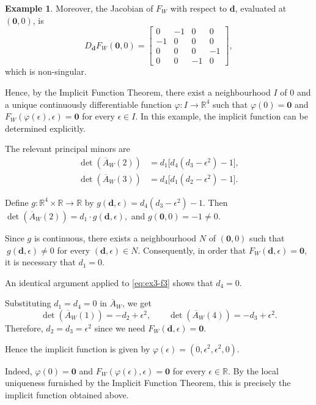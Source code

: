 \documentclass[12pt,reqno]{amsart}
\theoremstyle{plain}
\theoremstyle{definition}
\newtheorem{example}{Example}
\theoremstyle{block}
\theoremstyle{remark}
\numberwithin{equation}{section}
\begin{document}
\begin{example}
Moreover, the Jacobian of \(F_W\) with respect to \(\mathbf d\), evaluated
at \((\mathbf 0,0)\), is
\[
D_{\mathbf d}F_W(\mathbf 0,0)
=
\begin{bmatrix}
0&-1&0&0\\
-1&0&0&0\\
0&0&0&-1\\
0&0&-1&0
\end{bmatrix},
\]
which is non-singular.

Hence, by the Implicit Function Theorem, there exist a neighbourhood
\(I\) of \(0\) and a unique continuously differentiable function
\(
\varphi:I\longrightarrow\mathbb R^4
\)
such that
\(
\varphi(0)=\mathbf 0
\)
and
\(
F_W(\varphi(\epsilon),\epsilon)=\mathbf 0
\)
for every \(\epsilon\in I\). In this example, the implicit function can
be determined explicitly.

The relevant principal minors are
\begin{align}
\det(\overline A_W(2))
&=
d_1\bigl[d_4(d_3-\epsilon^2)-1\bigr],
\label{eq:ex3-f2}
\\
\det(\overline A_W(3))
&=
d_4\bigl[d_1(d_2-\epsilon^2)-1\bigr].
\label{eq:ex3-f3}
\end{align}

Define
\(
g:\mathbb R^4\times\mathbb R\longrightarrow\mathbb R
\)
by
\(
g(\mathbf d,\epsilon)
=
d_4(d_3-\epsilon^2)-1.
\)
Then
\(
\det(\overline A_W(2))=d_1\cdot g(\mathbf d,\epsilon),
\)
and
\(
g(\mathbf 0,0)=-1\neq0.
\)

Since \(g\) is continuous, there exists a neighbourhood \(N\) of
\((\mathbf 0,0)\) such that
\(\
g(\mathbf d,\epsilon)\neq0
\)
for every \((\mathbf d,\epsilon)\in N\). Consequently, in order that
\(
F_W(\mathbf d,\epsilon)=\mathbf 0,
\)
it is necessary that
\(
d_1=0.
\)

An identical argument applied to \eqref{eq:ex3-f3} shows that
\(
d_4=0.
\)

Substituting \(d_1=d_4=0\) 
in \(\overline{A}_W\), we get
\[
\det(\overline A_W(1))
=
-d_2+\epsilon^2, \qquad
\det(\overline A_W(4))
=
-d_3+\epsilon^2.
\]
Therefore,
\(
d_2=d_3=\epsilon^2
\) since we need \(F_W(\mathbf{d},\epsilon)=\mathbf{0}\).

Hence the implicit function is given by
\(
\varphi(\epsilon)
=
(0,\epsilon^2,\epsilon^2,0).
\)

Indeed,
\(
\varphi(0)=\mathbf 0
\)
and
\(
F_W(\varphi(\epsilon),\epsilon)=\mathbf 0
\)
for every \(\epsilon\in\mathbb R\). By the local uniqueness furnished by
the Implicit Function Theorem, this is precisely the implicit function
obtained above.


\end{example}
\end{document}
